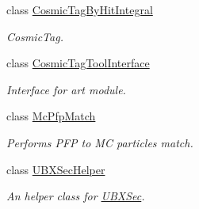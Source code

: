 \begin{DoxyCompactItemize}
class \hyperlink{classCosmicTagByHitIntegral}{Cosmic\-Tag\-By\-Hit\-Integral}
\begin{DoxyCompactList}\small\item\em Cosmic\-Tag. \end{DoxyCompactList}\item 
class \hyperlink{classCosmicTagToolInterface}{Cosmic\-Tag\-Tool\-Interface}
\begin{DoxyCompactList}\small\item\em Interface for art module. \end{DoxyCompactList}\item 
class \hyperlink{classMcPfpMatch}{Mc\-Pfp\-Match}
\begin{DoxyCompactList}\small\item\em Performs P\-F\-P to M\-C particles match. \end{DoxyCompactList}\item 
class \hyperlink{classUBXSecHelper}{U\-B\-X\-Sec\-Helper}
\begin{DoxyCompactList}\small\item\em An helper class for \hyperlink{classUBXSec}{U\-B\-X\-Sec}. \end{DoxyCompactList}\end{DoxyCompactItemize}
